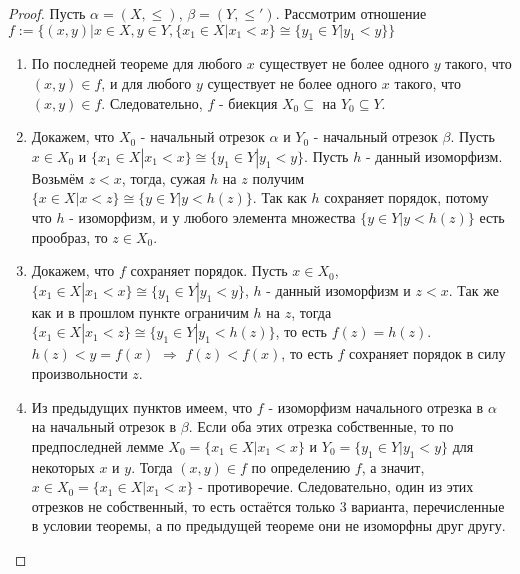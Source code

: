 \documentclass[a4paper, 12pt]{article}
\theoremstyle{definition}
\theoremstyle{plain}
\theoremstyle{remark}
\begin{document}
  \begin{proof}
    Пусть $\alpha=(X,\leqslant)$, $\beta=(Y,\leqslant')$. Рассмотрим отношение $f:=\{(x,y)|x\in X, y\in Y, \{x_1\in X|x_1<x\}\cong\{y_1\in Y|y_1<y\}\}$
    \begin{enumerate}
      \item По последней теореме для любого $x$ существует не более одного $y$ такого, что $(x, y)\in f$, и для любого $y$ существует не более одного $x$ такого, что $(x,y)\in f$. Следовательно, $f$ - биекция $X_0\subseteq$ на $Y_0\subseteq Y$.
      \item Докажем, что $X_0$ - начальный отрезок $\alpha$ и $Y_0$ - начальный отрезок $\beta$. Пусть $x\in X_0$ и $\{x_1\in X| x_1<x\}\cong\{y_1\in Y|y_1<y\}$. Пусть $h$ - данный изоморфизм. Возьмём $z<x$, тогда, сужая $h$ на $z$ получим $\{x\in X| x < z\}\cong\{y\in Y|y < h(z)\}$. Так как $h$ сохраняет порядок, потому что $h$ - изоморфизм, и у любого элемента множества $\{y\in Y|y < h(z)\}$ есть прообраз, то $z\in X_0$.
      \item Докажем, что $f$ сохраняет порядок. Пусть $x\in X_0$, $\{x_1\in X| x_1<x\}\cong\{y_1\in Y|y_1<y\}$, $h$ - данный изоморфизм и $z < x$. Так же как и в прошлом пункте ограничим $h$ на $z$, тогда $\{x_1\in X| x_1<z\}\cong\{y_1\in Y|y_1<h(z)\}$, то есть $f(z)=h(z)$. $h(z)< y=f(x)$ $\Longrightarrow$ $f(z)<f(x)$, то есть $f$ сохраняет порядок в силу произвольности $z$.
      \item Из предыдущих пунктов имеем, что $f$ - изоморфизм начального отрезка в $\alpha$ на начальный отрезок в $\beta$. Если оба этих отрезка собственные, то по предпоследней лемме $X_0=\{x_1\in X| x_1<x\}$ и $Y_0=\{y_1\in Y|y_1<y\}$ для некоторых $x$ и $y$. Тогда $(x,y)\in f$ по определению $f$, а значит, $x\in X_0=\{x_1\in X|x_1 < x\}$ - противоречие. Следовательно, один из этих отрезков не собственный, то есть остаётся только 3 варианта, перечисленные в условии теоремы, а по предыдущей теореме они не изоморфны друг другу.
    \end{enumerate}
  \end{proof}
\end{document}
